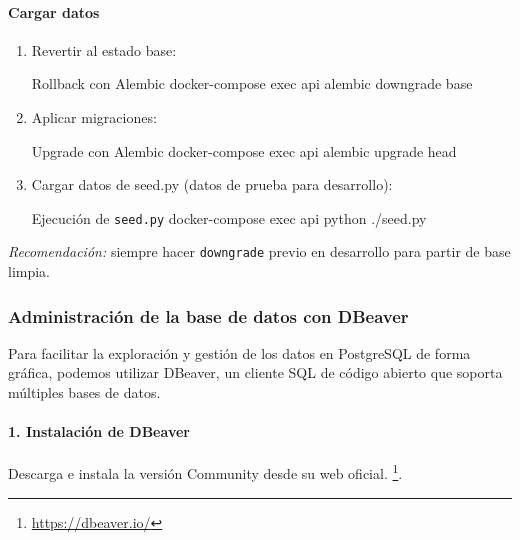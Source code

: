 \documentclass[12pt, a4paper]{article}
\begin{document}
\begin{umaappendices}
	\paragraph{Cargar datos}
	\begin{enumerate}
		\item Revertir al estado base:
		\begin{Terminal}{Rollback con Alembic}
			docker-compose exec api alembic downgrade base
		\end{Terminal}
		\item Aplicar migraciones:
		\begin{Terminal}{Upgrade con Alembic}
			docker-compose exec api alembic upgrade head
		\end{Terminal}
		\item Cargar datos de seed.py (datos de prueba para desarrollo):
		\begin{Terminal}{Ejecución de \texttt{seed.py}}
			docker-compose exec api python ./seed.py
		\end{Terminal}
	\end{enumerate}
	
	\noindent
	\emph{Recomendación:} siempre hacer \texttt{downgrade} previo en desarrollo para partir de base limpia.
	
	\subsubsection{Administración de la base de datos con DBeaver}
	\label{sec:dbeaver_admin}
	
	Para facilitar la exploración y gestión de los datos en PostgreSQL de forma gráfica, podemos utilizar DBeaver, un cliente SQL de código abierto que soporta múltiples bases de datos.
	
	\paragraph{1. Instalación de DBeaver}  
	Descarga e instala la versión Community desde su web oficial. \footnote{\url{https://dbeaver.io/}}.  
	

\end{umaappendices}
\end{document}
